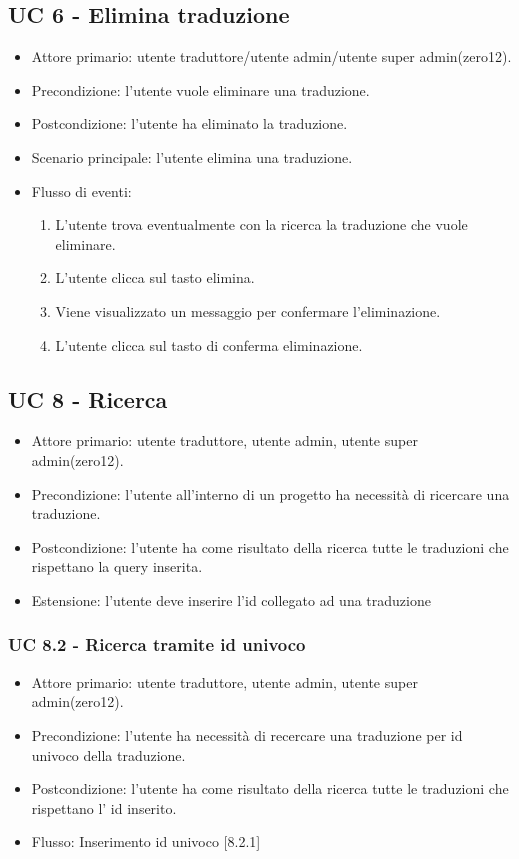 \subsection{UC 6 - Elimina traduzione}
    \begin{itemize}
        \item Attore primario: utente traduttore/utente admin/utente super admin(zero12).
        \item Precondizione: l'utente vuole eliminare una traduzione.
        \item Postcondizione: l'utente ha eliminato la traduzione.
        \item Scenario principale: l'utente elimina una traduzione.
        \item Flusso di eventi:
            \begin{enumerate}
                \item L'utente trova eventualmente con la ricerca la traduzione che vuole eliminare.
                \item L'utente clicca sul tasto elimina.
                \item Viene visualizzato un messaggio per confermare l'eliminazione.
                \item L'utente clicca sul tasto di conferma eliminazione.
            \end{enumerate}
    \end{itemize}
    \subsection{UC 8 - Ricerca}
    \begin{itemize}
        \item Attore primario: utente traduttore, utente admin, utente super admin(zero12).
        \item Precondizione: l'utente all'interno di un progetto ha necessità di ricercare una traduzione.
        \item Postcondizione: l'utente ha come risultato della ricerca tutte le traduzioni che rispettano la query inserita.
        \item Estensione: l'utente deve inserire l'id collegato ad una traduzione
    \end{itemize}
    \subsubsection{UC 8.2 - Ricerca tramite id univoco}
        \begin{itemize}
            \item Attore primario: utente traduttore, utente admin, utente super admin(zero12).
            \item Precondizione: l'utente ha necessità di recercare una traduzione per id univoco della traduzione.
            \item Postcondizione: l'utente ha come risultato della ricerca tutte le traduzioni che rispettano l' id inserito.
            \item Flusso: Inserimento id univoco [8.2.1]
        \end{itemize}
